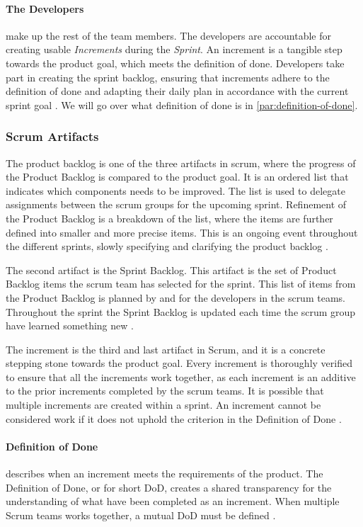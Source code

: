 \paragraph{The Developers}
make up the rest of the team members.
The developers are accountable for creating usable \emph{Increments} during the \emph{Sprint}. 
An increment is a tangible step towards the product goal, which meets the definition of done. 
Developers take part in creating the sprint backlog, ensuring that increments adhere to the definition of done and adapting their daily plan in accordance with the current sprint goal \cite{schwaber_sutherland_2022}.
We will go over what definition of done is in \autoref{par:definition-of-done}.

\subsubsection{Scrum Artifacts}
The product backlog is one of the three artifacts in scrum, where the progress of the Product Backlog is compared to the product goal.
It is an ordered list that indicates which components needs to be improved.
The list is used to delegate assignments between the scrum groups for the upcoming sprint.
Refinement of the Product Backlog is a breakdown of the list, where the items are further defined into smaller and more precise items.
This is an ongoing event throughout the different sprints, slowly specifying and clarifying the product backlog \cite{schwaber_sutherland_2022}. 

The second artifact is the Sprint Backlog. 
This artifact is the set of Product Backlog items the scrum team has selected for the sprint. 
This list of items from the Product Backlog is planned by and for the developers in the scrum teams. 
Throughout the sprint the Sprint Backlog is updated each time the scrum group have learned something new \cite{schwaber_sutherland_2022}. 

The increment is the third and last artifact in Scrum, and it is a concrete stepping stone towards the product goal.
Every increment is thoroughly verified to ensure that all the increments work together, as each increment is an additive to the prior increments completed by the scrum teams.
It is possible that multiple increments are created within a sprint.
An increment cannot be considered work if it does not uphold the criterion in the Definition of Done \cite{schwaber_sutherland_2022}.

\paragraph{Definition of Done}\label{par:definition-of-done}
describes when an increment meets the requirements of the product.
The Definition of Done, or for short DoD, creates a shared transparency for the understanding of what have been completed as an increment.
When multiple Scrum teams works together, a mutual DoD must be defined \cite{schwaber_sutherland_2022}.


